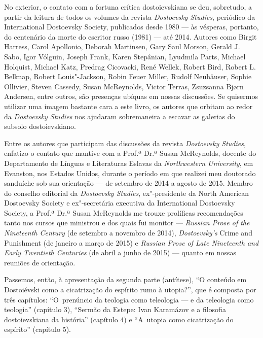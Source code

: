 No exterior, o contato com a fortuna crítica dostoievskiana se deu,
sobretudo, a partir da leitura de todos os volumes da revista
\emph{Dostoevsky Studies}, periódico da International Dostoevsky
Society, publicados desde 1980 --- às vésperas, portanto, do centenário
da morte do escritor russo (1981) --- até 2014. Autores como Birgit
Harress, Carol Apollonio, Deborah Martinsen, Gary Saul Morson, Gerald J.
Sabo, Igor Vólguin, Joseph Frank, Karen Stepânian, Lyudmila Parts,
Michael Holquist, Michael Katz, Predrag Cicovacki, René Wellek, Robert
Bird, Robert L. Belknap, Robert Louis"-Jackson, Robin Feuer Miller,
Rudolf Neuhäuser, Sophie Ollivier, Steven Cassedy, Susan McReynolds,
Victor Terras, Zsuzsanna Bjørn Andersen, entre outros, são presenças
ubíquas em nossas discussões. Se quisermos utilizar uma imagem bastante
cara a este livro, os autores que orbitam ao redor da \emph{Dostoevsky
Studies} nos ajudaram sobremaneira a escavar as galerias do subsolo
dostoievskiano.

Entre os autores que participam das discussões da revista
\emph{Dostoevsky Studies}, enfatizo o contato que mantive com a Prof.ª
Dr.ª Susan McReynolds, docente do Departamento de Línguas e Literaturas
Eslavas da \emph{Northwestern University}, em Evanston, nos Estados
Unidos, durante o período em que realizei meu doutorado sanduíche sob
sua orientação --- de setembro de 2014 a agosto de 2015. Membro do
conselho editorial da \emph{Dostoevsky Studies}, ex"-presidente da North
American Dostoevsky Society e ex"-secretária executiva da International
Dostoevsky Society, a Prof.ª Dr.ª Susan McReynolds me trouxe prolíficas
recomendações tanto nos cursos que ministrou e dos quais fui monitor ---
\emph{Russian Prose of the Nineteenth Century} (de setembro a novembro
de 2014), \emph{Dostoevsky's} Crime and Punishment (de janeiro a março
de 2015) e \emph{Russian Prose of Late Nineteenth and Early Twentieth
Centuries} (de abril a junho de 2015) --- quanto em nossas reuniões de
orientação.

Passemos, então, à apresentação da segunda parte (antítese), ``O
conteúdo em Dostoiévski como a cicatrização do espírito rumo à
utopia?'', que é composta por três capítulos: ``O~prenúncio da teologia
como teleologia --- e da teleologia como teologia'' (capítulo 3),
``Sermão da Estepe: Ivan Karamázov e a filosofia dostoievskiana da
história'' (capítulo 4) e ``A~utopia como cicatrização do espírito''
(capítulo 5).

